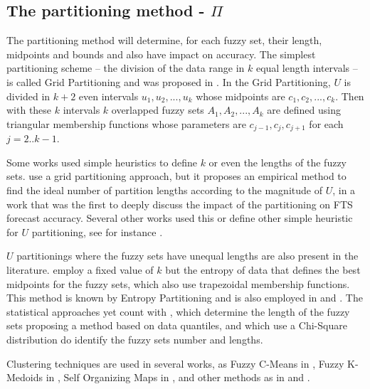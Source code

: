 %
\subsection{The partitioning method - $\Pi$}\index{$\Pi$}
\label{sec:fts_partitioningmethod}

The partitioning method will determine, for each fuzzy set,  their length, midpoints and bounds and also have impact on accuracy. The simplest partitioning scheme -- the division of the data range in $k$ equal length intervals -- is called Grid Partitioning and was proposed in \cite{song1993fuzzy}.  In the Grid Partitioning, $U$ is divided in $k+2$ even intervals $u_1, u_2, ..., u_k$ whose midpoints are $c_1, c_2, ..., c_k$. Then with these $k$ intervals $k$ overlapped fuzzy sets $A_1,A_2,...,A_k$ are defined using triangular membership functions whose parameters are $c_{j-1},c_j,c_{j+1}$ for each $j = 2..k-1$. 

Some works used simple heuristics to define $k$ or even the lengths of the fuzzy sets. \cite{huarng2001effective} use a grid partitioning approach, but it proposes an empirical method to find the ideal number of partition lengths according to the magnitude of $U$, in a work that was the first to deeply discuss the impact of the partitioning on FTS forecast accuracy. Several other works used this or define other simple heuristic for $U$ partitioning, see for instance \cite{Chang1997, huarng2005type, Rubio2016, Cheng2018}.

$U$ partitionings where the fuzzy sets have unequal lengths are also present in the literature. \cite{Cheng2006a} employ a fixed value of $k$ but the entropy of data that defines the best midpoints for the fuzzy sets, which also use trapezoidal membership functions. This method is known by Entropy Partitioning and is also employed in \cite{Cheng2008} and \cite{Chen2014}. The statistical approaches yet count with \cite{Ismail2015}, which determine the length of the fuzzy sets proposing a method based on data quantiles, and \cite{Yang2017} which use a Chi-Square distribution do identify the fuzzy sets number and lengths.

Clustering techniques are used in several works, as Fuzzy C-Means in \cite{Li2008b, Askari2015, Bas2015, Sun2015, Yolcu2017}, Fuzzy K-Medoids in \cite{Dincer2018}, Self Organizing Maps in \cite{Bahrepour2011}, and other methods as in \cite{Saberi2017} and \cite{Bose2017}.

